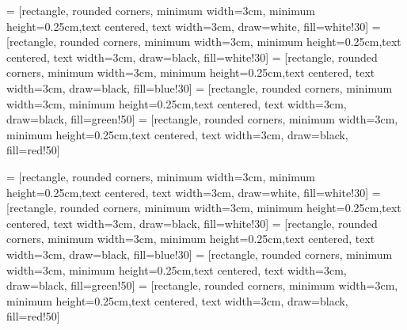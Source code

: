 \newcommand{\textblue}[1]{ \color{blue}#1\color{black} }
\newcommand{\textred}[1]{ \color{red}#1\color{black} }
\newcommand{\textgreen}[1]{ \color{red}#1\color{black} }
\newcommand{\bsmumu}{B_{s}^{0}\rightarrow \mu^{+}\mu^{-}}
\newcommand{\bpjpsik}{B^{+}\rightarrow J/\psi+K^{+}}
\newcommand{\bsjpsiphi}{B_{s}^{0}\rightarrow J/\psi + \phi}

\newcommand{\bbmumux}{b\bar{b}\rightarrow\mu^+\mu^-+X}
\newcommand{\bbjpsix}{b\bar{b}\rightarrow J/\psi+X}
\newcommand\tikzwidth{3}
\newcommand\tikzwidthwide{3}
\newcommand\tikzheight{0.25}
\newcommand\tikzdec{0.9}

\usetikzlibrary{shapes.geometric, arrows}
 = [rectangle, rounded corners, minimum width=\tikzwidth cm, minimum height=\tikzheight cm,text centered, text width=\tikzwidth cm, draw=white, fill=white!30]
 = [rectangle, rounded corners, minimum width=\tikzwidth cm, minimum height=\tikzheight cm,text centered, text width=\tikzwidth cm, draw=black, fill=white!30]
 = [rectangle, rounded corners, minimum width=\tikzwidth cm, minimum height=\tikzheight cm,text centered, text width=\tikzwidth cm, draw=black, fill=blue!30]
 = [rectangle, rounded corners, minimum width=\tikzwidth cm, minimum height=\tikzheight cm,text centered, text width=\tikzwidth cm, draw=black, fill=green!50]
 = [rectangle, rounded corners, minimum width=\tikzwidth cm, minimum height=\tikzheight cm,text centered, text width=\tikzwidth cm, draw=black, fill=red!50]

 = [rectangle, rounded corners, minimum width=\tikzwidthwide cm, minimum height=\tikzheight cm,text centered, text width=\tikzwidth cm, draw=white, fill=white!30]
 = [rectangle, rounded corners, minimum width=\tikzwidthwide cm, minimum height=\tikzheight cm,text centered, text width=\tikzwidth cm, draw=black, fill=white!30]
 = [rectangle, rounded corners, minimum width=\tikzwidthwide cm, minimum height=\tikzheight cm,text centered, text width=\tikzwidth cm, draw=black, fill=blue!30]
 = [rectangle, rounded corners, minimum width=\tikzwidthwide cm, minimum height=\tikzheight cm,text centered, text width=\tikzwidth cm, draw=black, fill=green!50]
 = [rectangle, rounded corners, minimum width=\tikzwidthwide cm, minimum height=\tikzheight cm,text centered, text width=\tikzwidth cm, draw=black, fill=red!50]

